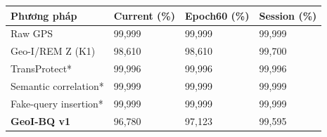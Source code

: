 \par\smallskip\noindent\begin{tabularx}{\linewidth}{@{}P{4cm}XXX@{}}\toprule
\textbf{Phương pháp} & \textbf{Current (\%)} & \textbf{Epoch60 (\%)} & \textbf{Session (\%)} \\
\midrule
Raw GPS & 99{,}999 & 99{,}999 & 99{,}999 \\
Geo-I/REM Z (K1) & 98{,}610 & 98{,}610 & 99{,}700 \\
TransProtect* & 99{,}996 & 99{,}996 & 99{,}996 \\
Semantic correlation* & 99{,}999 & 99{,}999 & 99{,}999 \\
Fake-query insertion* & 99{,}999 & 99{,}999 & 99{,}999 \\
\textbf{GeoI-BQ v1} & 96{,}780 & 97{,}123 & 99{,}595 \\
\bottomrule\end{tabularx}\par\smallskip
